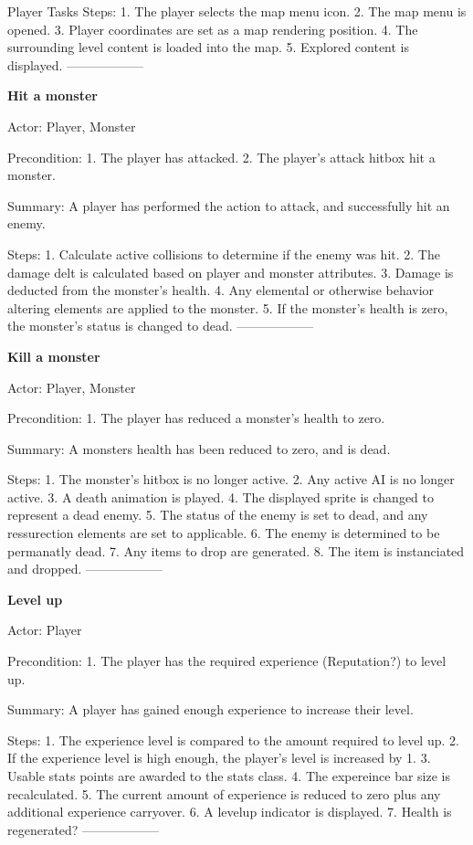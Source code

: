\documentclass[12pt]{report}
\begin{document}
\begin {section}{Player Tasks}
Steps:
1. The player selects the map menu icon.
2. The map menu is opened.
3. Player coordinates are set as a map rendering position.
4. The surrounding level content is loaded into the map.
5. Explored content is displayed.
------------------

\textbf{Hit a monster} %

Actor: Player, Monster

Precondition:
1. The player has attacked.
2. The player's attack hitbox hit a monster.

Summary: A player has performed the action to attack, and successfully hit an enemy.

Steps:
1. Calculate active collisions to determine if the enemy was hit.
2. The damage delt is calculated based on player and monster attributes.
3. Damage is deducted from the monster's health. 
4. Any elemental or otherwise behavior altering elements are applied to the monster.
5. If the monster's health is zero, the monster's status is changed to dead.
------------------

\textbf{Kill a monster} %

Actor: Player, Monster

Precondition:
1. The player has reduced a monster's health to zero.

Summary: A monsters health has been reduced to zero, and is dead.

Steps:
1. The monster's hitbox is no longer active.
2. Any active AI is no longer active.
3. A death animation is played.
4. The displayed sprite is changed to represent a dead enemy.
5. The status of the enemy is set to dead, and any ressurection elements are set to applicable.
6. The enemy is determined to be permanatly dead.
7. Any items to drop are generated.
8. The item is instanciated and dropped.
------------------

\textbf{Level up} %

Actor: Player

Precondition:
1. The player has the required experience (Reputation?) to level up.

Summary: A player has gained enough experience to increase their level. 

Steps:
1. The experience level is compared to the amount required to level up. 
2. If the experience level is high enough, the player's level is increased by 1.
3. Usable stats points are awarded to the stats class. 
4. The expereince bar size is recalculated.
5. The current amount of experience is reduced to zero plus any additional experience carryover.
6. A levelup indicator is displayed.
7. Health is regenerated?
------------------


\end{section}
\end{document}
